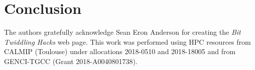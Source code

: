 \documentclass[aip,jcp,reprint,showkeys]{revtex4-1}
\begin{document}
\section{Conclusion}


\begin{acknowledgments}
The authors gratefully acknowledge Sean Eron Anderson for creating the 
\emph{Bit Twiddling Hacks} web page.
This work was performed using HPC resources from CALMIP (Toulouse) under
allocations 2018-0510 and 2018-18005 and from GENCI-TGCC (Grant
2018-A0040801738).
\end{acknowledgments}



\end{document}
